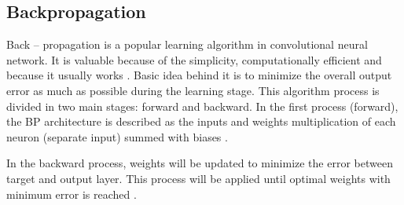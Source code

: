 \subsection{Backpropagation}
Back – propagation is a popular learning algorithm in convolutional neural network. It is valuable because of the simplicity, computationally efficient and because it usually works \citep{Bengio2012}.
Basic idea behind it is to minimize the overall output error as much as possible during the learning stage. This algorithm process is divided in two main stages: forward and backward. In the first process (forward), the BP architecture is described as  the inputs and weights multiplication of each neuron (separate input) summed with biases \citep{Hameed2016}. 

In the backward process, weights will be updated to minimize the error between target and output layer.
This process will be applied until optimal weights with minimum error is reached \citep{Hameed2016}.


